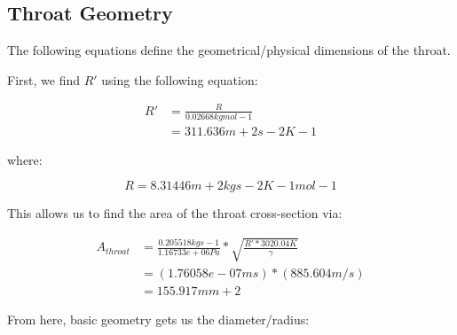\documentclass[12pt]{report}
\begin{document}
\subsection{Throat Geometry}

The following equations define the geometrical/physical dimensions of the throat.




\vspace{10 mm}

First, we find $ \boldsymbol{\mathit{R'}} $ using the following equation:  \vspace{10 mm} 

\begin{equation}
\begin{split}
\boldsymbol{\mathit{R'}} & = \frac{\boldsymbol{\mathit{R}}}{0.02668 kg mol-1}\\
 & = 311.636 m+2 s-2 K-1
\end{split}
\end{equation}


\vspace{6 mm}

where: 

\vspace{6 mm}

\begin{equation}
\boldsymbol{\mathit{R}} = 8.31446 m+2 kg s-2 K-1 mol-1
\end{equation}


\vspace{10 mm}

This allows us to find the area of the throat cross-section via: \vspace{10 mm} 

\begin{equation}
\begin{split}
\boldsymbol{\mathit{A_{throat}}} & = \frac{0.205518 kg s-1}{1.16733e+06 Pa} * \sqrt{\frac{\boldsymbol{\mathit{R'}} * 3020.04 K}{\boldsymbol{\mathit{\gamma}}}}\\
 & = \left(1.76058e-07 m s\right) * \left(885.604 m/s\right)\\
 & = 155.917 mm+2 
\end{split}
\end{equation}


\vspace{10 mm}

From here, basic geometry gets us the diameter/radius:



\vspace{10 mm}
\end{document}
